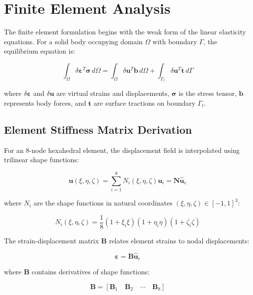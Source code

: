 \documentclass[11pt]{report}
\newcommand{\vect}[1]{\boldsymbol{#1}}
\newcommand{\matr}[1]{\mathbf{#1}}
\newcommand{\domain}{\Omega}
\newcommand{\dispvect}{\vect{u}}
\begin{document}
\section{Finite Element Analysis}
The finite element formulation begins with the weak form of the linear elasticity equations. For a solid body occupying domain $\domain$ with boundary $\Gamma$, the equilibrium equation is:

\begin{equation}
\int_{\domain} \delta\vect{\varepsilon}^T \vect{\sigma} \, d\domain = \int_{\domain} \delta\dispvect^T \vect{b} \, d\domain + \int_{\Gamma_t} \delta\dispvect^T \vect{t} \, d\Gamma
\end{equation}

where $\delta\vect{\varepsilon}$ and $\delta\dispvect$ are virtual strains and displacements, $\vect{\sigma}$ is the stress tensor, $\vect{b}$ represents body forces, and $\vect{t}$ are surface tractions on boundary $\Gamma_t$.

\subsection{Element Stiffness Matrix Derivation}
For an 8-node hexahedral element, the displacement field is interpolated using trilinear shape functions:

\begin{equation}
\vect{u}(\xi,\eta,\zeta) = \sum_{i=1}^{8} N_i(\xi,\eta,\zeta) \vect{u}_i = \matr{N} \hat{\vect{u}}_e
\end{equation}

where $N_i$ are the shape functions in natural coordinates $(\xi,\eta,\zeta) \in [-1,1]^3$:

\begin{equation}
N_i(\xi,\eta,\zeta) = \frac{1}{8}(1 + \xi_i\xi)(1 + \eta_i\eta)(1 + \zeta_i\zeta)
\end{equation}

The strain-displacement matrix $\matr{B}$ relates element strains to nodal displacements:

\begin{equation}
\vect{\varepsilon} = \matr{B} \hat{\vect{u}}_e
\end{equation}

where $\matr{B}$ contains derivatives of shape functions:

\begin{equation}
\matr{B} = [\matr{B}_1 \quad \matr{B}_2 \quad \cdots \quad \matr{B}_8]
\end{equation}
\end{document}
